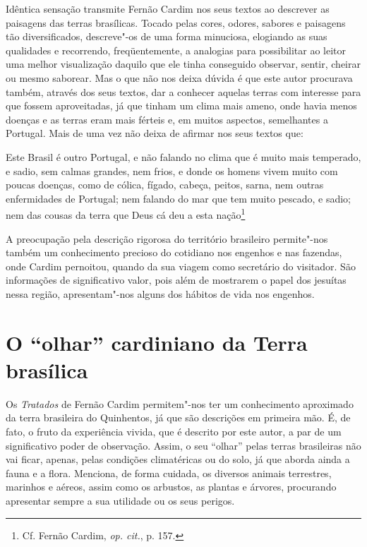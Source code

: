Idêntica sensação transmite Fernão Cardim nos seus textos ao
descrever as paisagens das terras brasílicas. Tocado pelas cores,
odores, sabores e paisagens tão diversificados, descreve"-os de uma
forma minuciosa, elogiando as suas qualidades e recorrendo,
freqüentemente, a analogias para possibilitar ao leitor uma melhor
visualização daquilo que ele tinha conseguido observar, sentir, cheirar
ou mesmo saborear. Mas o que não nos deixa dúvida é que este autor
procurava também, através dos seus textos, dar a conhecer aquelas
terras com interesse para que fossem aproveitadas, já que tinham um clima
mais ameno, onde havia menos doenças e as terras eram mais férteis e,
em muitos aspectos, semelhantes a Portugal. Mais de uma vez não deixa
de afirmar nos seus textos que:

\begin{hedraquote} 
Este Brasil é outro Portugal, e não falando no clima que é
muito mais temperado, e sadio, sem calmas grandes, nem frios, e donde
os homens vivem muito com poucas doenças, como de cólica, fígado,
cabeça, peitos, sarna, nem outras enfermidades de Portugal; nem falando
do mar que tem muito pescado, e sadio; nem das cousas da terra que Deus
cá deu a esta nação\footnote{ Cf. Fernão Cardim, \textit{op. cit.}, p. 157.} 
\end{hedraquote}

 A preocupação pela descrição rigorosa do território
brasileiro permite"-nos também um conhecimento precioso do cotidiano
nos engenhos e nas fazendas, onde Cardim pernoitou, quando da sua
viagem como secretário do visitador. São informações de significativo
valor, pois além de mostrarem o papel dos jesuítas nessa região,
apresentam"-nos alguns dos hábitos de vida nos engenhos.

\section{O ``olhar'' cardiniano da Terra brasílica}

 Os \textit{Tratados} de Fernão Cardim permitem"-nos ter um
conhecimento aproximado da terra brasileira do Quinhentos, já que são
descrições em primeira mão. É, de fato, o fruto da experiência vivida,
que é descrito por este autor, a par de um significativo poder de
observação. Assim, o seu ``olhar'' pelas terras brasileiras não vai
ficar, apenas, pelas condições climatéricas ou do solo, já que aborda
ainda a fauna e a flora. Menciona, de forma cuidada, os diversos
animais terrestres, marinhos e aéreos, assim como os arbustos, as
plantas e árvores, procurando apresentar sempre a sua utilidade ou os seus perigos.

